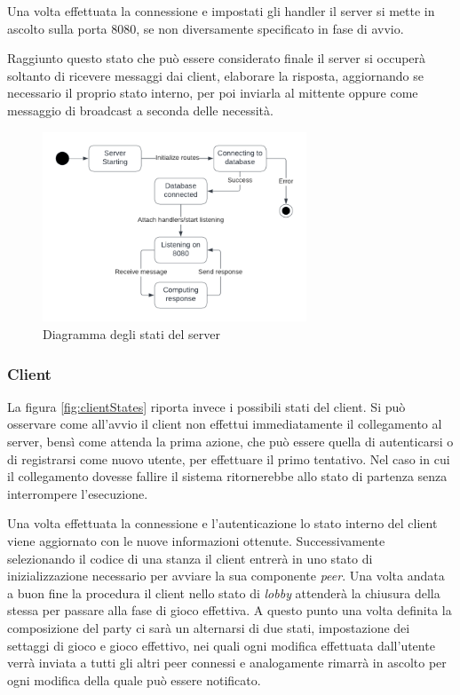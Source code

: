 Una volta effettuata la connessione e impostati gli handler il server si mette in ascolto sulla porta 8080, se non diversamente specificato in fase di avvio.

Raggiunto questo stato che può essere considerato finale il server si occuperà soltanto di ricevere messaggi dai client, elaborare la risposta, aggiornando se necessario il proprio stato interno, per poi inviarla al mittente oppure come messaggio di broadcast a seconda delle necessità.


\begin{figure}[H]
\centering
\includegraphics[width=0.7\textwidth]{img/draw/uml_state_server.png}
\caption{Diagramma degli stati del server}
\label{fig:serverStates}
\end{figure}

\subsubsection{Client}
La figura \ref{fig:clientStates} riporta invece i possibili stati del client. Si può osservare come all'avvio il client non effettui immediatamente il collegamento al server, bensì come attenda la prima azione, che può essere quella di autenticarsi o di registrarsi come nuovo utente, per effettuare il primo tentativo. Nel caso in cui il collegamento dovesse fallire il sistema ritornerebbe allo stato di partenza senza interrompere l'esecuzione.

Una volta effettuata la connessione e l'autenticazione lo stato interno del client viene aggiornato con le nuove informazioni ottenute. Successivamente selezionando il codice di una stanza il client entrerà in uno stato di inizializzazione necessario per avviare la sua componente \emph{peer}. Una volta andata a buon fine la procedura il client nello stato di \emph{lobby} attenderà la chiusura della stessa per passare alla fase di gioco effettiva. A questo punto una volta definita la composizione del party ci sarà un alternarsi di due stati, impostazione dei settaggi di gioco e gioco effettivo, nei quali ogni modifica effettuata dall'utente verrà inviata a tutti gli altri peer connessi e analogamente rimarrà in ascolto per ogni modifica della quale può essere notificato.


